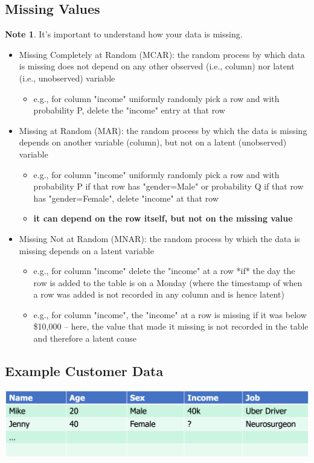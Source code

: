 \documentclass[11pt]{article}
\theoremstyle{definition}
\newtheorem{note}{Note}
\begin{document}
\subsection{Missing Values}
\begin{note}
    It's important to understand how your data is missing.
\end{note}
\begin{itemize}
    \item Missing Completely at Random (MCAR): the random process by which data is
    missing does not depend on any other observed (i.e., column) nor latent
    (i.e., unobserved) variable
    \begin{itemize}
        \item e.g., for column "income" uniformly randomly pick a row and with probability P, delete the
        "income" entry at that row
    \end{itemize}
    \item Missing at Random (MAR): the random process by which the data is missing
    depends on another variable (column), but not on a latent (unobserved) variable
    \begin{itemize}
        \item e.g., for column "income" uniformly randomly pick a row and with probability P if that row has
        "gender=Male" or probability Q if that row has "gender=Female", delete "income" at that row
        \item \textbf{it can depend on the row itself, but not on the missing value}
    \end{itemize}
    \item Missing Not at Random (MNAR): the random process by which the data is missing depends on a latent variable
    \begin{itemize}
        \item e.g., for column "income" delete the "income" at a row *if* the day the row is added to the
        table is on a Monday (where the timestamp of when a row was added is not recorded in any
        column and is hence latent)
        \item e.g., for column "income", the "income" at a row is missing if it was below \$10,000 – here, the
        value that made it missing is not recorded in the table and therefore a latent cause
    \end{itemize}
\end{itemize}

\subsection{Example Customer Data}
\includegraphics[width=\textwidth]{15.png}
\end{document}
